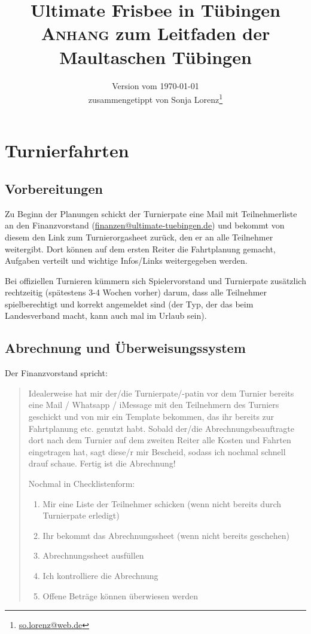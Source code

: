 \documentclass[a4 paper, 11pt]{article}
\title{{\normalsize Ultimate Frisbee in Tübingen} \\ \textbf{\textsc{Anhang} zum Leitfaden der Maultaschen Tübingen}}
\author{Version vom \today \\ {\footnotesize zusammengetippt von Sonja Lorenz\footnote{\href{mailto:so.lorenz@web.de}{so.lorenz@web.de}}}}
\date{}
\begin{document}
	
\pagestyle{fancy} %
	
\maketitle

\tableofcontents

\newpage

\section{Turnierfahrten}

\subsection{Vorbereitungen}
Zu Beginn der Planungen schickt der Turnierpate eine Mail mit Teilnehmerliste an den Finanzvorstand (\href{mailto:finanzen@ultimate-tuebingen.de}{finanzen@ultimate-tuebingen.de}) und bekommt von diesem den Link zum Turnierorgasheet zurück, den er an alle Teilnehmer weitergibt. Dort können auf dem ersten Reiter die Fahrtplanung gemacht, Aufgaben verteilt und wichtige Infos/Links weitergegeben werden. 

Bei offiziellen Turnieren kümmern sich Spielervorstand und Turnierpate zusätzlich rechtzeitig (spätestens 3-4 Wochen vorher) darum, dass alle Teilnehmer spielberechtigt und korrekt angemeldet sind (der Typ, der das beim Landesverband macht, kann auch mal im Urlaub sein).

\subsection{Abrechnung und Überweisungssystem}
Der Finanzvorstand spricht:
\begin{quote}
	Idealerweise hat mir der/die Turnierpate/-patin vor dem Turnier bereits eine Mail / Whatsapp / iMessage mit den Teilnehmern des Turniers geschickt und von mir ein Template bekommen, das ihr bereits zur Fahrtplanung etc. genutzt habt. Sobald der/die Abrechnungsbeauftragte dort nach dem Turnier auf dem zweiten Reiter alle Kosten und Fahrten eingetragen hat, sagt diese/r mir Bescheid, sodass ich nochmal schnell drauf schaue. Fertig ist die Abrechnung!
	
	Nochmal in Checklistenform:
	\begin{enumerate}
		\item Mir eine Liste der Teilnehmer schicken (wenn nicht bereits durch Turnierpate erledigt)
		\item Ihr bekommt das Abrechnungssheet (wenn nicht bereits geschehen)
		\item Abrechnungssheet ausfüllen
		\item Ich kontrolliere die Abrechnung 
		\item Offene Beträge können überwiesen werden
	\end{enumerate}
\end{quote}
\end{document}
